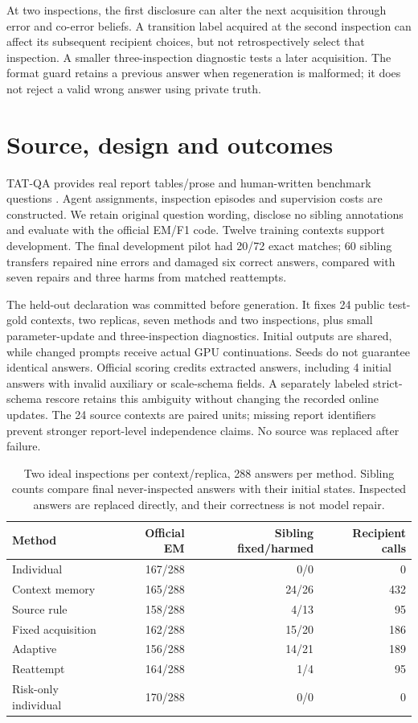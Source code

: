 \documentclass[10pt]{article}
\begin{document}
At two inspections, the first disclosure can alter the next acquisition through error and co-error beliefs. A transition label acquired at the second inspection can affect its subsequent recipient choices, but not retrospectively select that inspection. A smaller three-inspection diagnostic tests a later acquisition. The format guard retains a previous answer when regeneration is malformed; it does not reject a valid wrong answer using private truth.

\section{Source, design and outcomes}
TAT-QA provides real report tables/prose and human-written benchmark questions \cite{tatqa}. Agent assignments, inspection episodes and supervision costs are constructed. We retain original question wording, disclose no sibling annotations and evaluate with the official EM/F1 code. Twelve training contexts support development. The final development pilot had 20/72 exact matches; 60 sibling transfers repaired nine errors and damaged six correct answers, compared with seven repairs and three harms from matched reattempts.

The held-out declaration was committed before generation. It fixes 24 public test-gold contexts, two replicas, seven methods and two inspections, plus small parameter-update and three-inspection diagnostics. Initial outputs are shared, while changed prompts receive actual GPU continuations. Seeds do not guarantee identical answers. Official scoring credits extracted answers, including 4 initial answers with invalid auxiliary or scale-schema fields. A separately labeled strict-schema rescore retains this ambiguity without changing the recorded online updates. The 24 source contexts are paired units; missing report identifiers prevent stronger report-level independence claims. No source was replaced after failure.

\begin{table}[ht]\centering\small
\begin{tabular}{lrrr}\toprule Method & Official EM & Sibling fixed/harmed & Recipient calls\\\midrule
Individual & 167/288 & 0/0 & 0 \\
Context memory & 165/288 & 24/26 & 432 \\
Source rule & 158/288 & 4/13 & 95 \\
Fixed acquisition & 162/288 & 15/20 & 186 \\
Adaptive & 156/288 & 14/21 & 189 \\
Reattempt & 164/288 & 1/4 & 95 \\
Risk-only individual & 170/288 & 0/0 & 0 \\
\bottomrule\end{tabular}
\caption{Two ideal inspections per context/replica, 288 answers per method. Sibling counts compare final never-inspected answers with their initial states. Inspected answers are replaced directly, and their correctness is not model repair.}\end{table}
\end{document}
